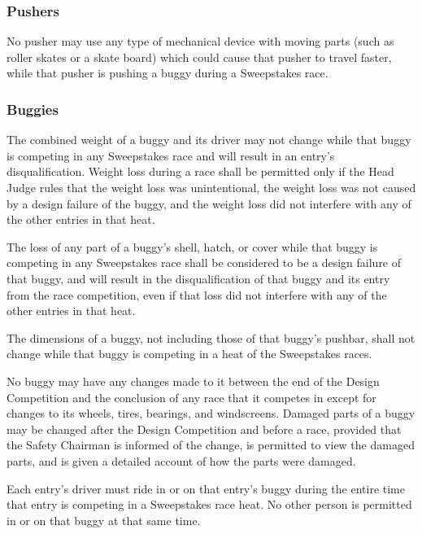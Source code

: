 \subsubsection{Pushers}

	No pusher may use any type of mechanical device with moving parts (such as roller skates or a skate board) which could cause that pusher to travel faster, while that pusher is pushing a buggy during a Sweepstakes race.

\subsubsection{Buggies}

	The combined weight of a buggy and its driver may not change while that buggy is competing in any Sweepstakes race and will result in an entry's disqualification. Weight loss during a race shall be permitted only if the Head Judge rules that the weight loss was unintentional, the weight loss was not caused by a design failure of the buggy, and the weight loss did not interfere with any of the other entries in that heat.

	The loss of any part of a buggy's shell, hatch, or cover while that buggy is competing in any Sweepstakes race shall be considered to be a design failure of that buggy, and will result in the disqualification of that buggy and its entry from the race competition, even if that loss did not interfere with any of the other entries in that heat.

	The dimensions of a buggy, not including those of that buggy's pushbar, shall not change while that buggy is competing in a heat of the Sweepstakes races.

	No buggy may have any changes made to it between the end of the Design Competition and the conclusion of any race that it competes in except for changes to its wheels, tires, bearings, and windscreens. Damaged parts of a buggy may be changed after the Design Competition and before a race, provided that the Safety Chairman is informed of the change, is permitted to view the damaged parts, and is given a detailed account of how the parts were damaged.

	Each entry's driver must ride in or on that entry's buggy during the entire time that entry is competing in a Sweepstakes race heat. No other person is permitted in or on that buggy at that same time.

